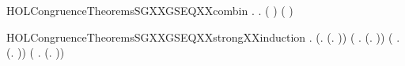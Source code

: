 \newcommand{\HOLCongruenceTheoremsSGXXcases}{\UseVerbatim{HOLCongruenceTheoremsSGXXcases}}
\begin{SaveVerbatim}{HOLCongruenceTheoremsSGXXGSEQXXcombin}
\HOLTokenTurnstile{} \HOLSymConst{\HOLTokenForall{}}.   \HOLSymConst{\HOLTokenConj{}}   \HOLSymConst{\HOLTokenImp{}} \HOLSymConst{\HOLTokenForall{}}.   \HOLSymConst{\HOLTokenImp{}}  ( \HOLConst{\HOLTokenCompose} ) \HOLSymConst{\HOLTokenConj{}}  ( \HOLConst{\HOLTokenCompose} )
\end{SaveVerbatim}
\newcommand{\HOLCongruenceTheoremsSGXXGSEQXXcombin}{\UseVerbatim{HOLCongruenceTheoremsSGXXGSEQXXcombin}}
\begin{SaveVerbatim}{HOLCongruenceTheoremsSGXXGSEQXXstrongXXinduction}
\HOLTokenTurnstile{} \HOLSymConst{\HOLTokenForall{}}.
       (\HOLSymConst{\HOLTokenForall{}}.  (\HOLTokenLambda{}. )) \HOLSymConst{\HOLTokenConj{}} (\HOLSymConst{\HOLTokenForall{}} .   \HOLSymConst{\HOLTokenImp{}}  (\HOLTokenLambda{}.   )) \HOLSymConst{\HOLTokenConj{}}
       (\HOLSymConst{\HOLTokenForall{}} .   \HOLSymConst{\HOLTokenConj{}}   \HOLSymConst{\HOLTokenConj{}}   \HOLSymConst{\HOLTokenImp{}}  (\HOLTokenLambda{}.  )) \HOLSymConst{\HOLTokenConj{}}
       (\HOLSymConst{\HOLTokenForall{}} .
              \HOLSymConst{\HOLTokenConj{}}   \HOLSymConst{\HOLTokenConj{}}   \HOLSymConst{\HOLTokenConj{}}   \HOLSymConst{\HOLTokenConj{}}   \HOLSymConst{\HOLTokenConj{}}   \HOLSymConst{\HOLTokenImp{}}
             (\HOLTokenLambda{}. \HOLConst{\ensuremath{\tau}}  \HOLSymConst{+} \HOLConst{\ensuremath{\tau}} )) \HOLSymConst{\HOLTokenConj{}}

\end{SaveVerbatim}
